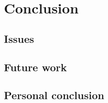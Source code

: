 \chapter{Conclusion} \label{chap:conclusion}


\pagebreak

\section{Issues}



\section{Future work}




\section{Personal conclusion}
